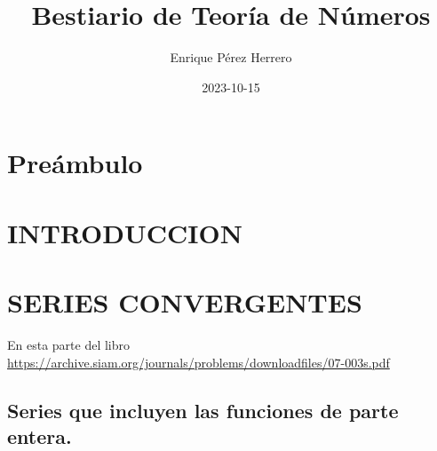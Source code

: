 \documentclass[
  letterpaper,
  DIV=11,
  numbers=noendperiod]{scrreprt}
\title{Bestiario de Teoría de Números}
\author{Enrique Pérez Herrero}
\date{2023-10-15}
\renewcommand*\contentsname{Table of contents}
\newcommand\contentsname{Table of contents}
\begin{document}
\maketitle
\ifdefined\Shaded\renewenvironment{Shaded}{\begin{tcolorbox}[breakable, boxrule=0pt, interior hidden, borderline west={3pt}{0pt}{shadecolor}, enhanced, sharp corners, frame hidden]}{\end{tcolorbox}}\fi

\renewcommand*\contentsname{Table of contents}
{
\hypersetup{linkcolor=}
\setcounter{tocdepth}{2}
\tableofcontents
}

\hypertarget{preuxe1mbulo}{%
\chapter*{Preámbulo}\label{preuxe1mbulo}}



\hypertarget{intro}{%
\chapter{INTRODUCCION}\label{intro}}


\hypertarget{series-convergentes}{%
\chapter{SERIES CONVERGENTES}\label{series-convergentes}}

En esta parte del libro
\url{https://archive.siam.org/journals/problems/downloadfiles/07-003s.pdf}

\hypertarget{series-que-incluyen-las-funciones-de-parte-entera.}{%
\section{Series que incluyen las funciones de parte
entera.}\label{series-que-incluyen-las-funciones-de-parte-entera.}}
\end{document}
